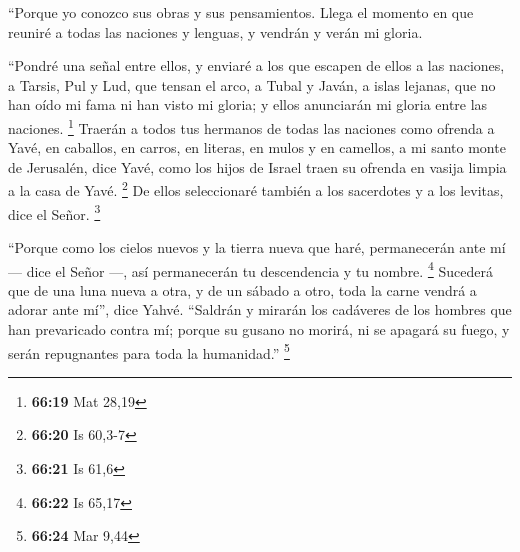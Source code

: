  ``Porque yo conozco sus obras y sus pensamientos. Llega
el momento en que reuniré a todas las naciones y lenguas, y vendrán y
verán mi gloria.

 ``Pondré una señal entre ellos, y enviaré a los que
escapen de ellos a las naciones, a Tarsis, Pul y Lud, que tensan el
arco, a Tubal y Javán, a islas lejanas, que no han oído mi fama ni han
visto mi gloria; y ellos anunciarán mi gloria entre las naciones.
\footnote{\textbf{66:19} Mat 28,19}  Traerán a todos tus
hermanos de todas las naciones como ofrenda a Yavé, en caballos, en
carros, en literas, en mulos y en camellos, a mi santo monte de
Jerusalén, dice Yavé, como los hijos de Israel traen su ofrenda en
vasija limpia a la casa de Yavé. \footnote{\textbf{66:20} Is 60,3-7}
 De ellos seleccionaré también a los sacerdotes y a los
levitas, dice el Señor. \footnote{\textbf{66:21} Is 61,6}

 ``Porque como los cielos nuevos y la tierra nueva que
haré, permanecerán ante mí --- dice el Señor ---, así permanecerán tu
descendencia y tu nombre. \footnote{\textbf{66:22} Is 65,17}
 Sucederá que de una luna nueva a otra, y de un sábado a
otro, toda la carne vendrá a adorar ante mí'', dice Yahvé.
 ``Saldrán y mirarán los cadáveres de los hombres que han
prevaricado contra mí; porque su gusano no morirá, ni se apagará su
fuego, y serán repugnantes para toda la humanidad.'' \footnote{\textbf{66:24}
  Mar 9,44}
